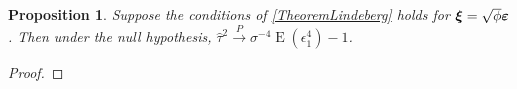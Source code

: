 \documentclass[11pt]{article}
\DeclareMathOperator{\myE}{E}
\newcommand{\bfsym}[1]{\ensuremath{\boldsymbol{#1}}}
\def\bxi{\bfsym {\xi}}
\theoremstyle{plain}
\newtheorem{proposition}{\quad\quad Proposition}
\theoremstyle{definition}
\theoremstyle{remark}
\begin{document}
\begin{proposition}
    Suppose the conditions of \ref{TheoremLindeberg} holds for $\bxi=\sqrt \phi \bepsilon$.
    Then under the null hypothesis, $\hat \tau^2 \xrightarrow{P} \sigma^{-4} \myE (\epsilon_1^4)-1$.
\end{proposition}
\begin{proof}
    
\end{proof}












\end{document}
